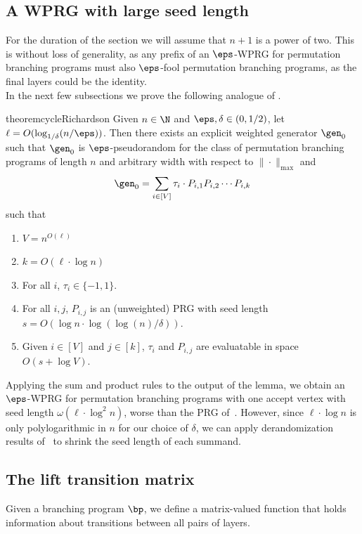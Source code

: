\subsection{A WPRG with large seed length}
For the duration of the section we will assume that $n+1$ is a power of two. This is without loss of generality, as any prefix of an $\eps$-WPRG for permutation branching programs must also $\eps$-fool permutation branching programs, as the final layers could be the identity.\\ 

In the next few subsections we prove the following analogue of 
. %
\begin{restatable}{theorem}{cycleRichardson}
\label{thm:cycleRichardson}
Given $n \in \N$ and $\eps,\delta \in (0,1/2)$, let $\ell=O( \log_{1/\delta}(n/\eps))$. 
Then there exists an explicit weighted generator $\gen_0$ such that $\gen_0$ is $\eps$-pseudorandom for the class of permutation branching programs of length $n$ and arbitrary width with respect to $\|\cdot\|_{\max}$ and 
\[\gen_0 = \sum_{i\in [V]}\tau_i\cdot P_{i,1}P_{i,2}\cdots P_{i,k}\]
such that %
\begin{enumerate}
    \item $V=n^{O(\ell)}$
    \item $k=O(\ell\cdot \log n)$
    \item For all $i$, $\tau_i\in \{-1,1\}$.
    \item For all $i,j$, $P_{i,j}$ is an (unweighted) PRG with seed length $s=O(\log n \cdot\log(\log(n)/\delta))$.
    \item Given $i\in [V]$ and $j\in [k]$, $\tau_i$ and $P_{i,j}$ are evaluatable in space $O(s+\log V)$.
\end{enumerate}
\end{restatable}

Applying the sum and product rules to the output of the lemma, we obtain an $\eps$-WPRG for permutation branching programs with one accept vertex with seed length $\omega(\ell\cdot \log^2 n)$, worse than the PRG of~\cite{HozaPyVa21}. However, since $\ell\cdot \log n$ is only polylogarithmic in $n$ for our choice of $\delta$, we can apply derandomization results of~\cite{HozaPyVa21} to shrink the seed length of each summand. 

\subsection{The lift transition matrix}
Given a branching program $\bp$, we define a %
matrix-valued %
function that holds information about transitions between all pairs of layers.

